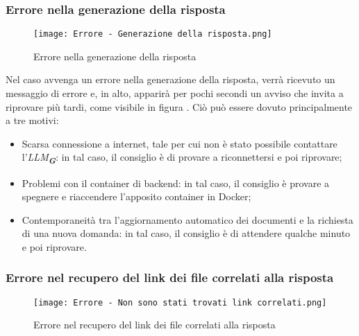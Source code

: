 \subsubsection{Errore nella generazione della risposta}

\begin{figure}[h]
    \centering
        \texttt{[image: Errore - Generazione della risposta.png]}
        \caption{Errore nella generazione della risposta}
        \label{fig:Errore nella generazione della risposta}
\end{figure}

Nel caso avvenga un errore nella generazione della risposta, verrà ricevuto un messaggio di errore e, in alto, apparirà per pochi secondi un avviso che invita a riprovare più tardi, come visibile in figura . Ciò può essere dovuto principalmente a tre motivi:
\begin{itemize}
    \item Scarsa connessione a internet, tale per cui non è stato possibile contattare l'\emph{LLM}\textsubscript{\textbf{\textit{G}}}: in tal caso, il consiglio è di provare a riconnettersi e poi riprovare;
    \item Problemi con il container di backend: in tal caso, il consiglio è provare a spegnere e riaccendere l'apposito container in Docker;
    \item Contemporaneità tra l'aggiornamento automatico dei documenti e la richiesta di una nuova domanda: in tal caso, il consiglio è di attendere qualche minuto e poi riprovare.
\end{itemize}



\subsubsection{Errore nel recupero del link dei file correlati alla risposta}

\begin{figure}[h]
    \centering
        \texttt{[image: Errore - Non sono stati trovati link correlati.png]}
        \caption{Errore nel recupero del link dei file correlati alla risposta}
        \label{fig:Errore nel recupero del link dei file correlati alla risposta}
\end{figure}

